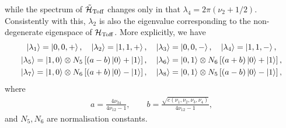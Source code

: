 while the spectrum of $\tilde{{\mathcal{H}}}_{\operatorname{Toff}}$ changes only in that
$\lambda_4 = 2\pi(\nu_2 + 1/2)$.
Consistently with this, $\lambda_2$ is also the eigenvalue corresponding to the non-degenerate eigenspace of ${\mathcal{H}}_{\operatorname{Toff}}$.
More explicitly, we have
\begin{equation}
\begin{gathered}
    \ket{\lambda_1} = \ket{0, 0, +}, \quad
    \ket{\lambda_2} = \ket{1, 1, +}, \quad
    \ket{\lambda_3} = \ket{0, 0, -}, \quad
    \ket{\lambda_4} = \ket{1, 1, -}, \\
    \begin{aligned}
    \ket{\lambda_5} &= \ket{1, 0} \otimes N_5\left[(a - b) \ket0 + \ket1 \right], \quad
    \ket{\lambda_6} = \ket{0, 1} \otimes N_6\left[(a + b) \ket0 + \ket1 \right], \\
    \ket{\lambda_7} &= \ket{1, 0} \otimes N_6\left[(a + b) \ket0 - \ket1 \right], \quad
    \ket{\lambda_8} = \ket{0, 1} \otimes N_5\left[(a - b) \ket0 - \ket1 \right],
    \end{aligned}
\end{gathered}
\label{eq:GL:toffoli_eigenvectors_solution}
\end{equation}
where
\begin{equation}
\begin{gathered}
	a = \frac{4\nu_{34}}{4\nu_{12}-1},
	\qquad
	b = \frac{\sqrt{c(\nu_1,\nu_2,\nu_3,\nu_4)}}{4\nu_{12}-1},
\end{gathered}
\end{equation}
and $N_5,N_6$ are normalisation constants.
